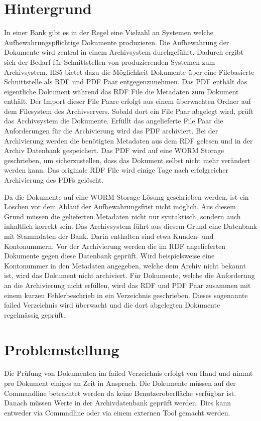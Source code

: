 \documentclass[a4paper,oneside, 12pt]{report}
\begin{document}
\section{Hintergrund}
In einer Bank gibt es in der Regel eine Vielzahl an Systemen welche Aufbewahrungspflichtige Dokumente produzieren. Die Aufbewahrung der Dokumente wird zentral in einem Archivsystem durchgeführt. Dadurch ergibt sich der Bedarf für Schnittstellen von produzierenden Systemen zum Archivsystem. \ac{HS5} bietet dazu die Möglichkeit Dokumente über eine Filebasierte Schnittstelle als \ac{RDF} und PDF Paar entgegenzunehmen. Das PDF enthält das eigentliche Dokument während das \ac{RDF} File die Metadaten zum Dokument enthält. Der Import dieser File Paare erfolgt aus einem überwachten Ordner auf dem Filesystem des Archivservers. Sobald dort ein File Paar abgelegt wird, prüft das Archivsystem die Dokumente. Erfüllt das angelieferte File Paar die Anforderungen für die Archivierung wird das PDF archiviert. Bei der Archivierung werden die benötigten Metadaten aus dem \ac{RDF} gelesen und in der Archiv Datenbank gespeichert. Das PDF wird auf eine \ac{WORM} Storage geschrieben, um sicherzustellen, dass das Dokument selbst nicht mehr verändert werden kann. Das originale \ac{RDF} File wird einige Tage nach erfolgreicher Archivierung des PDFs gelöscht.

Da die Dokumente auf eine \ac{WORM} Storage Lösung geschrieben werden, ist ein Löschen vor dem Ablauf der Aufbewahrungsfrist nicht möglich. Aus diesem Grund müssen die gelieferten Metadaten nicht nur syntaktisch, sondern auch inhaltlich korrekt sein. Das Archivsystem führt aus diesem Grund eine Datenbank mit Stammdaten der Bank. Darin enthalten sind etwa Kunden- und Kontonummern. Vor der Archivierung werden die im \ac{RDF} angelieferten Dokumente gegen diese Datenbank geprüft. Wird beispielsweise eine Kontonummer in den Metadaten angegeben, welche dem Archiv nicht bekannt ist, wird das Dokument nicht archiviert. Für Dokumente, welche die Anforderung an die Archivierung nicht erfüllen, wird das RDF und PDF Paar zusammen mit einem kurzen Fehlerbeschrieb in ein Verzeichnis geschrieben. Dieses sogenannte failed Verzeichnis wird überwacht und die dort abgelegten Dokumente regelmässig geprüft.

\section{Problemstellung}
Die Prüfung von Dokumenten im failed Verzeichnis erfolgt von Hand und nimmt pro Dokument einiges an Zeit in Anspruch. Die Dokumente müssen auf der Commandline betrachtet werden da keine Benutzeroberfläche verfügbar ist. Danach müssen Werte in der Archivdatenbank geprüft werden. Dies kann entweder via Commndline oder via einem externen Tool gemacht werden. 
\end{document}
